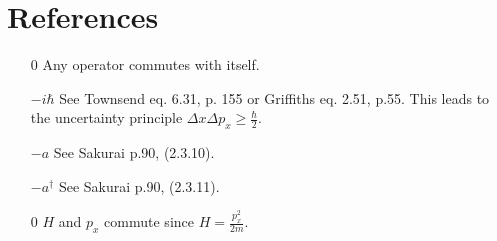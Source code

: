 \documentclass[12pt,letterpaper]{article}
\begin{document}
\section{References}
\begin{itemize}
\item[0] \label{self} Any operator commutes with itself.
\item[$-i \hbar$] \label{unc} See Townsend eq. 6.31, p. 155 or Griffiths eq. 2.51, p.55. This leads to the uncertainty principle $\Delta x \Delta p_x \geq \frac{\hbar}{2}$.
\item[$-a$] \label{N-a} See Sakurai p.90, (2.3.10).
\item[$-a^\dagger$] \label{N-aDag} See Sakurai p.90, (2.3.11).
\item[0] \label{H-p_x} $H$ and $p_x$ commute since $H = \frac{p_x^2}{2m}$.
\end{itemize}
\end{document}
